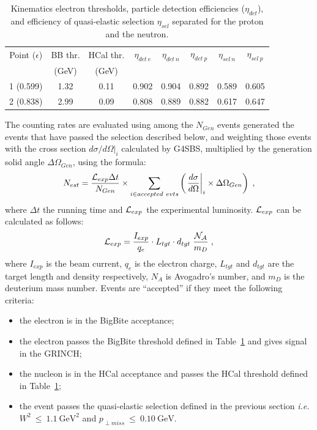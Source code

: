 \begin{table}[h]
\centering
\begin{tabular}{|c|c|c|c|c|c|c|c|}
\hline
Point ($\epsilon$) & BB thr. & HCal thr. & $\eta_{det~e}$ & $\eta_{det~n}$ & $\eta_{det~p}$ & $\eta_{sel~n}$ & $\eta_{sel~p}$ \\
 & (GeV) & (GeV) &  &  &  &  &  \\
\hline
1 (0.599) & 1.32 & 0.11 & 0.902 & 0.904 & 0.892 & 0.589 & 0.605 \\ 
\hline
2 (0.838) & 2.99 & 0.09 & 0.808 & 0.889 & 0.882 & 0.617 & 0.647 \\
\hline
\end{tabular} 
\caption{Kinematics electron thresholds, particle detection efficiencies ($\eta_{det}$), and efficiency of quasi-elastic selection $\eta_{sel}$ separated for the proton and the neutron.}
\label{tab:kinEffs}
\end{table}
The counting rates are evaluated using among the $N_{Gen}$ events generated the events that have passed the selection described below, and weighting those events with the cross section ${d\sigma}/{d\Omega}|_i$ calculated by G4SBS, multiplied by the generation solid angle $\Delta\Omega_{Gen}$, using the formula:
\begin{equation}
  N_{est} = \frac{{\cal L}_{exp} \Delta t}{N_{Gen}} \times \sum_{i \in accepted~evts}\left( \left. \frac{d\sigma}{d\Omega}\right|_i \times \Delta\Omega_{Gen} \right) \;,
\end{equation}
where $\Delta t$ the running time and ${\cal L}_{exp}$ the experimental luminosity. ${\cal L}_{exp}$ can be calculated as follows:
\begin{equation}
  {\cal{L}}_{exp} = \frac{I_{exp}}{q_e}\cdot L_{tgt}\cdot d_{tgt}\;\frac{\cal{N}_A}{m_{D}}\;,
\end{equation}
where $I_{exp}$ is the beam current, $q_e$ is the electron charge, $L_{tgt}$ and $d_{tgt}$ are the target length and density respectively, $N_A$ is Avogadro's number, and $m_D$ is the deuterium mass number.
Events are ``accepted'' if they meet the following criteria:
%
\begin{itemize}
\item{the electron is in the BigBite acceptance};
\item{the electron passes the BigBite threshold defined in Table~\ref{tab:kinEffs} and gives signal in the GRINCH;}
\item{the nucleon is in the HCal acceptance and passes the HCal threshold defined in Table~\ref{tab:kinEffs};}
\item{the event passes the quasi-elastic selection defined in the previous section {\it i.e.} $W^2~\leq~1.1~\mathrm{GeV}^2$ and $p_{\perp miss}~\leq~0.10~\mathrm{GeV}$.} 
\end{itemize}
%

